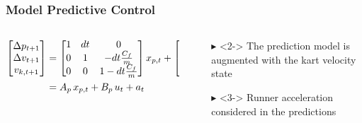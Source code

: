 \documentclass[9pt, aspectratio=169]{beamer}
\begin{document}
\begin{frame}
\frametitle{Model Predictive Control}
\centering
\begin{columns}
\begin{column}{0.6\textwidth}
\begin{equation*}
\begin{aligned}
        \begin{bmatrix}
            \Delta p_{t+1}  \\
            \Delta v_{t+1} \\
            v_{k,t+1}
        \end{bmatrix}
        & =
        \begin{bmatrix}
            1 & dt & 0 \\
            0 & 1 & -dt\frac{C_f}{m} \\
            0 & 0 & 1-dt\frac{C_f}{m}
        \end{bmatrix}
        x_{p,t}
        +
        \begin{bmatrix}
            0 \\
            dt \frac{C_{m1}}{m} \\
            dt \frac{C_{m1}}{m}
        \end{bmatrix}
        u_t + 
	 \alert<3>{
        \begin{bmatrix}
        0 \\
        - dt a_{r,t} \\
        0
        \end{bmatrix} }\\
        & = A_p \, x_{p,t} + B_p \, u_t + a_t
\end{aligned}
\end{equation*}
\end{column}

\begin{column}{0.4\textwidth}

\begin{itemize}
\vspace{0.1cm}
\footnotesize
	\item[$\blacktriangleright$] <2-> The prediction model is augmented with the kart velocity state
	\item[$\blacktriangleright$] <3-> Runner acceleration considered in the predictions
\end{itemize}
\end{column}
\end{columns}


\end{frame}
\end{document}
